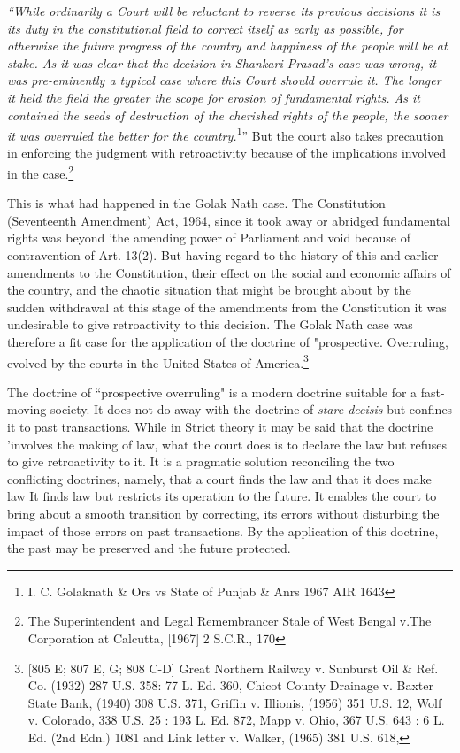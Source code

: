 \begin{multicols}{2}
\noi
\textit{“While ordinarily a Court will be reluctant to reverse its previous decisions it is its duty
in the constitutional field to correct itself as early as possible, for otherwise the future
progress of the country and happiness of the people will be at stake. As it was clear that
the decision in Shankari Prasad's case was wrong, it was pre-eminently a typical case
where this Court should overrule it. The longer it held the field the greater the scope
for erosion of fundamental rights. As it contained the seeds of destruction of the
cherished rights of the people, the sooner it was overruled the better for the country.}\footnote{I. C. Golaknath \& Ors vs State of Punjab \& Anrs 1967 AIR 1643}”
But the court also takes precaution in enforcing the judgment with retroactivity because
of the implications involved in the case.\footnote{The Superintendent and Legal Remembrancer Stale of West Bengal v.The Corporation at Calcutta,
[1967] 2 S.C.R., 170}

\noi
This is what had happened in the Golak Nath case. The Constitution (Seventeenth
Amendment) Act, 1964, since it took away or abridged fundamental rights was beyond
'the amending power of Parliament and void because of contravention of Art. 13(2).
But having regard to the history of this and earlier amendments to the Constitution,
their effect on the social and economic affairs of the country, and the chaotic situation
that might be brought about by the sudden withdrawal at this stage of the amendments
from the Constitution it was undesirable to give retroactivity to this decision. The Golak
Nath case was therefore a fit case for the application of the doctrine of "prospective.
Overruling, evolved by the courts in the United States of America.\footnote{ [805 E; 807 E, G; 808 C-D] Great Northern Railway v. Sunburst Oil \& Ref. Co. (1932) 287 U.S. 358:
77 L. Ed. 360, Chicot County Drainage v. Baxter State Bank, (1940) 308 U.S. 371, Griffin v. Illionis, (1956) 351 U.S. 12, Wolf v. Colorado, 338 U.S. 25 : 193 L. Ed. 872, Mapp v. Ohio, 367 U.S. 643 : 6 L.
Ed. (2nd Edn.) 1081 and Link letter v. Walker, (1965) 381 U.S. 618, }


\noi
The doctrine of “prospective overruling" is a modern doctrine suitable for a fast-moving
society. It does not do away with the doctrine of \textit{stare decisis} but confines it to past
transactions. While in Strict theory it may be said that the doctrine 'involves the making
of law, what the court does is to declare the law but refuses to give retroactivity to it. It
is a pragmatic solution reconciling the two conflicting doctrines, namely, that a court
finds the law and that it does make law It finds law but restricts its operation to the
future. It enables the court to bring about a smooth transition by correcting, its errors
without disturbing the impact of those errors on past transactions. By the application of
this doctrine, the past may be preserved and the future protected. 



\end{multicols}
